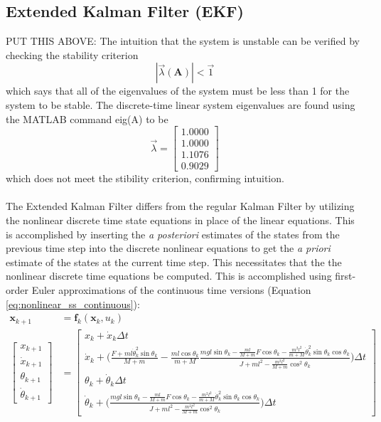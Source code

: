 \documentclass{article}
\newcommand{\matr}[1]{\bm{#1}}     %
\begin{document}
\subsection{Extended Kalman Filter (EKF)}
PUT THIS ABOVE:
The intuition that the system is unstable can be verified by checking the stability criterion
\begin{equation}
|\vec{\lambda}(\matr{A})| < \vec{1}
\end{equation}
which says that all of the eigenvalues of the system must be less than 1 for the system to be stable. The discrete-time linear system eigenvalues are found using the MATLAB command eig(A) to be
\begin{equation}
\vec{\lambda} = \begin{bmatrix}
    1.0000 \\
    1.0000 \\
    1.1076 \\
    0.9029
\end{bmatrix}
\end{equation}
which does not meet the stibility criterion, confirming intuition.\\
\\
The Extended Kalman Filter differs from the regular Kalman Filter by utilizing the nonlinear discrete time state equations in place of the linear equations. This is accomplished by inserting the \textit{a posteriori} estimates of the states from the previous time step into the discrete nonlinear equations to get the \textit{a priori} estimate of the states at the current time step. This necessitates that the the nonlinear discrete time equations be computed. This is accomplished using first-order Euler approximations of the continuous time versions (Equation \ref{eq:nonlinear_ss_continuous}):
\begin{equation}
\begin{aligned}
\matr{x}_{k+1} &= \matr{f}_k (\matr{x}_k,u_k) \\
\begin{bmatrix}
x_{k+1} \\[8pt]
\dot{x}_{k+1} \\[8pt]
\theta_{k+1} \\[8pt]
\dot{\theta}_{k+1}
\end{bmatrix} &= \begin{bmatrix}
x_k + \dot{x}_k \Delta t \\
\dot{x}_k + \biggr(\frac{F+ml\dot{\theta}_k^2\sin\theta_k}{M+m} -\frac{ml\cos\theta_k}{m+M}\frac{mgl\sin\theta_k- \frac{ml}{M+m} F\cos\theta_k -\frac{m^2l^2}{m+M}\dot{\theta}_k^2\sin\theta_k\cos\theta_k}{J+ml^2-\frac{m^2l^2}{M+m}\cos^2 \theta_k}\biggr) \Delta t  \\
\theta_k + \dot{\theta}_k \Delta t \\
\dot{\theta}_k + \biggr(\frac{mgl\sin\theta_k - \frac{ml}{M+m} F\cos\theta_k -\frac{m^2l^2}{m+M}\dot{\theta}_k^2\sin\theta_k\cos\theta_k}{J+ml^2-\frac{m^2l^2}{M+m}\cos^2 \theta_k}\biggr) \Delta t
\end{bmatrix}
\end{aligned}
\label{eq:nonlinear_discrete}
\end{equation}
\end{document}
